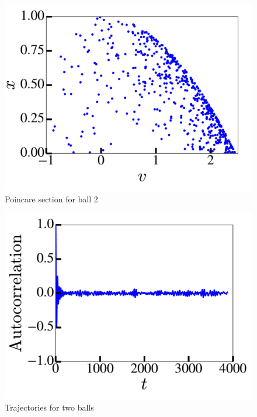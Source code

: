 \documentclass[pra,twocolumn,showpacs,amsmath,amssymb, aps, 10pt]{revtex4-1}
\begin{document}
\begin{figure}
  \includegraphics[width=0.8\linewidth]{r2_0_poincare}
  \caption{Poincare section for ball 2}
  \label{fig:0.5-poincare}
\end{figure}

\begin{figure}
  \includegraphics[width=0.8\linewidth]{r2_0_acorr}
  \caption{Trajectories for two balls}
  \label{fig:0.5-acorr}
\end{figure}





\end{document}

